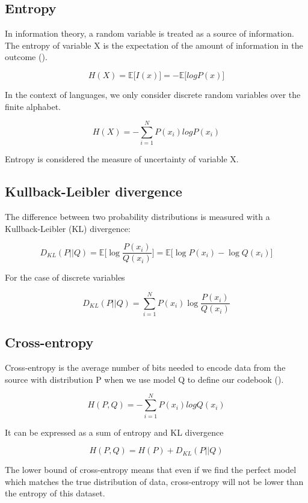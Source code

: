 \subsection{Entropy}

In information theory, a random variable is treated as a source of information. The entropy of variable X is the expectation of the amount of information in the outcome (\cite{Mack03}).

\[ H(X) = \mathbb{E}\big[ I(x) \big] = - \mathbb{E}\big[ log P(x) \big] \]

In the context of languages, we only consider discrete random variables over the finite alphabet.

\[ H(X) = - \sum_{i=1}^N P(x_i) log P(x_i) \]

Entropy is considered the measure of uncertainty of variable X.

\subsection{Kullback-Leibler divergence}
\label{sec:Background-KL}

The difference between two probability distributions is measured with a Kullback-Leibler (KL) divergence:

\[ D_{KL}(P||Q) = \mathbb{E}\bigg[ \log \frac{P(x_i)}{Q(x_i)} \bigg] = \mathbb{E}\big[ \log P(x_i) - \log Q(x_i) \big] \]

For the case of discrete variables

\[ D_{KL}(P||Q) = \sum_{i=1}^N P(x_i) \log \frac{P(x_i)}{Q(x_i)} \]

\subsection{Cross-entropy}

Cross-entropy is the average number of bits needed to encode data from the source with distribution P when we use model Q to define our codebook (\cite{Murp13}).

\[ H(P, Q) = - \sum_{i=1}^N P(x_i) log Q(x_i) \]

It can be expressed as a sum of entropy and KL divergence

\begin{equation}
    H(P, Q) = H(P) + D_{KL}(P||Q)
    \label{eq:KL-Entropy}
\end{equation}

The lower bound of cross-entropy means that even if we find the perfect model which matches the true distribution of data, cross-entropy will not be lower than the entropy of this dataset.

